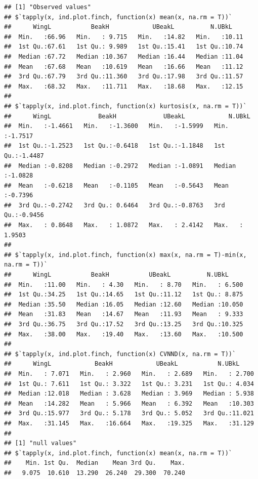 \documentclass[12pt]{article}\usepackage[]{graphicx}\usepackage[]{color}
\makeatletter
\newenvironment{kframe}{%
 \def\at@end@of@kframe{}%
 \ifinner\ifhmode%
  \def\at@end@of@kframe{\end{minipage}}%
  \begin{minipage}{\columnwidth}%
 \fi\fi%
 \def\FrameCommand##1{\hskip\@totalleftmargin \hskip-\fboxsep
 \colorbox{shadecolor}{##1}\hskip-\fboxsep
     \hskip-\linewidth \hskip-\@totalleftmargin \hskip\columnwidth}%
 \MakeFramed {\advance\hsize-\width
   \@totalleftmargin\z@ \linewidth\hsize
   \@setminipage}}%
 {\par\unskip\endMakeFramed%
 \at@end@of@kframe}
\newenvironment{knitrout}{}{} %
\makeatother
\begin{document}
\begin{knitrout}
\begin{kframe}
\begin{alltt}
\end{alltt}
\begin{verbatim}
## [1] "Observed values"
## $`tapply(x, ind.plot.finch, function(x) mean(x, na.rm = T))`
##      WingL           BeakH            UBeakL          N.UBkL     
##  Min.   :66.96   Min.   : 9.715   Min.   :14.82   Min.   :10.11  
##  1st Qu.:67.61   1st Qu.: 9.989   1st Qu.:15.41   1st Qu.:10.74  
##  Median :67.72   Median :10.367   Median :16.44   Median :11.04  
##  Mean   :67.68   Mean   :10.619   Mean   :16.66   Mean   :11.12  
##  3rd Qu.:67.79   3rd Qu.:11.360   3rd Qu.:17.98   3rd Qu.:11.57  
##  Max.   :68.32   Max.   :11.711   Max.   :18.68   Max.   :12.15  
## 
## $`tapply(x, ind.plot.finch, function(x) kurtosis(x, na.rm = T))`
##      WingL             BeakH             UBeakL            N.UBkL       
##  Min.   :-1.4661   Min.   :-1.3600   Min.   :-1.5999   Min.   :-1.7517  
##  1st Qu.:-1.2523   1st Qu.:-0.6418   1st Qu.:-1.1848   1st Qu.:-1.4487  
##  Median :-0.8208   Median :-0.2972   Median :-1.0891   Median :-1.0828  
##  Mean   :-0.6218   Mean   :-0.1105   Mean   :-0.5643   Mean   :-0.7396  
##  3rd Qu.:-0.2742   3rd Qu.: 0.6464   3rd Qu.:-0.8763   3rd Qu.:-0.9456  
##  Max.   : 0.8648   Max.   : 1.0872   Max.   : 2.4142   Max.   : 1.9503  
## 
## $`tapply(x, ind.plot.finch, function(x) max(x, na.rm = T)-min(x, na.rm = T))`
##      WingL           BeakH           UBeakL          N.UBkL      
##  Min.   :11.00   Min.   : 4.30   Min.   : 8.70   Min.   : 6.500  
##  1st Qu.:34.25   1st Qu.:14.65   1st Qu.:11.12   1st Qu.: 8.875  
##  Median :35.50   Median :16.05   Median :12.60   Median :10.050  
##  Mean   :31.83   Mean   :14.67   Mean   :11.93   Mean   : 9.333  
##  3rd Qu.:36.75   3rd Qu.:17.52   3rd Qu.:13.25   3rd Qu.:10.325  
##  Max.   :38.00   Max.   :19.40   Max.   :13.60   Max.   :10.500  
## 
## $`tapply(x, ind.plot.finch, function(x) CVNND(x, na.rm = T))`
##      WingL            BeakH            UBeakL           N.UBkL      
##  Min.   : 7.071   Min.   : 2.960   Min.   : 2.689   Min.   : 2.700  
##  1st Qu.: 7.611   1st Qu.: 3.322   1st Qu.: 3.231   1st Qu.: 4.034  
##  Median :12.018   Median : 3.628   Median : 3.969   Median : 5.938  
##  Mean   :14.282   Mean   : 5.966   Mean   : 6.392   Mean   :10.303  
##  3rd Qu.:15.977   3rd Qu.: 5.178   3rd Qu.: 5.052   3rd Qu.:11.021  
##  Max.   :31.145   Max.   :16.664   Max.   :19.325   Max.   :31.129  
## 
## [1] "null values"
## $`tapply(x, ind.plot.finch, function(x) mean(x, na.rm = T))`
##    Min. 1st Qu.  Median    Mean 3rd Qu.    Max. 
##   9.075  10.610  13.290  26.240  29.300  70.240 

\end{verbatim}
\end{kframe}
\end{knitrout}
\end{document}
